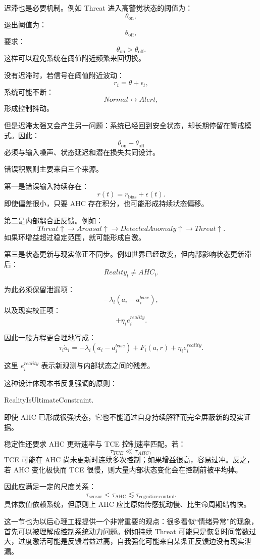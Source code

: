 迟滞也是必要机制。例如 Threat 进入高警觉状态的阈值为：
\[
\theta_{\mathrm{on}},
\]
退出阈值为：
\[
\theta_{\mathrm{off}},
\]
要求：
\[
\boxed{
\theta_{\mathrm{on}}>
\theta_{\mathrm{off}}.
}
\]
这样可以避免系统在阈值附近频繁来回切换。

没有迟滞时，若信号在阈值附近波动：
\[
r_t=\theta+\epsilon_t,
\]
系统可能不断：
\[
Normal\leftrightarrow Alert,
\]
形成控制抖动。

但是迟滞太强又会产生另一问题：系统已经回到安全状态，却长期停留在警戒模式。因此：
\[
\theta_{\mathrm{on}}
-
\theta_{\mathrm{off}}
\]
必须与输入噪声、状态延迟和潜在损失共同设计。

错误积累则主要来自三个来源。

第一是错误输入持续存在：
\[
r(t)=r_{\mathrm{bias}}+\epsilon(t).
\]
即使偏差很小，只要 AHC 存在积分，也可能形成持续状态偏移。

第二是内部耦合正反馈。例如：
\[
Threat\uparrow
\rightarrow
Arousal\uparrow
\rightarrow
DetectedAnomaly\uparrow
\rightarrow
Threat\uparrow.
\]
如果环增益超过稳定范围，就可能形成自激。

第三是状态更新与现实修正不同步。例如世界已经改变，但内部影响状态更新滞后：
\[
Reality_t
\neq
AHC_t.
\]

为此必须保留泄漏项：
\[
-\lambda_i(a_i-a_i^{base}),
\]
以及现实校正项：
\[
+\eta_i e_i^{reality}.
\]

因此一般方程更合理地写成：
\[
\tau_i\dot a_i
=
-\lambda_i(a_i-a_i^{base})
+
F_i(a,r)
+
\eta_i e_i^{reality}.
\]

这里 \(e_i^{reality}\) 表示新观测与内部状态之间的残差。

这种设计体现本书反复强调的原则：
\begin{statementbox}
RealityIsUltimateConstraint.
\end{statementbox}

即使 AHC 已形成很强状态，它也不能通过自身持续解释而完全屏蔽新的现实证据。

稳定性还要求 AHC 更新速率与 TCE 控制速率匹配。若：
\[
\tau_{TCE}
\ll
\tau_{AHC},
\]
TCE 可能在 AHC 尚未更新时连续多次控制；如果增益很高，容易过冲。反之，若 AHC 变化极快而 TCE 很慢，则大量内部状态变化会在控制前被平均掉。

因此应满足一定的尺度关系：
\[
\tau_{\mathrm{sensor}}
<
\tau_{\mathrm{AHC}}
\lesssim
\tau_{\mathrm{cognitive\,control}}.
\]
具体数值依赖系统，但原则上 AHC 应比原始传感扰动慢、比生命周期结构快。

这一节也为以后心理工程提供一个非常重要的观点：很多看似“情绪异常”的现象，首先可以被理解成控制系统动力问题。例如持续 Threat 可能只是恢复时间常数过大，过度激活可能是反馈增益过高，自我强化可能来自某条正反馈边没有现实泄漏。

